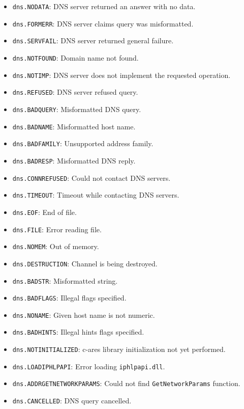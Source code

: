 \begin{itemize}
\tightlist
\item
  \texttt{dns.NODATA}: DNS server returned an answer with no data.
\item
  \texttt{dns.FORMERR}: DNS server claims query was misformatted.
\item
  \texttt{dns.SERVFAIL}: DNS server returned general failure.
\item
  \texttt{dns.NOTFOUND}: Domain name not found.
\item
  \texttt{dns.NOTIMP}: DNS server does not implement the requested
  operation.
\item
  \texttt{dns.REFUSED}: DNS server refused query.
\item
  \texttt{dns.BADQUERY}: Misformatted DNS query.
\item
  \texttt{dns.BADNAME}: Misformatted host name.
\item
  \texttt{dns.BADFAMILY}: Unsupported address family.
\item
  \texttt{dns.BADRESP}: Misformatted DNS reply.
\item
  \texttt{dns.CONNREFUSED}: Could not contact DNS servers.
\item
  \texttt{dns.TIMEOUT}: Timeout while contacting DNS servers.
\item
  \texttt{dns.EOF}: End of file.
\item
  \texttt{dns.FILE}: Error reading file.
\item
  \texttt{dns.NOMEM}: Out of memory.
\item
  \texttt{dns.DESTRUCTION}: Channel is being destroyed.
\item
  \texttt{dns.BADSTR}: Misformatted string.
\item
  \texttt{dns.BADFLAGS}: Illegal flags specified.
\item
  \texttt{dns.NONAME}: Given host name is not numeric.
\item
  \texttt{dns.BADHINTS}: Illegal hints flags specified.
\item
  \texttt{dns.NOTINITIALIZED}: c-ares library initialization not yet
  performed.
\item
  \texttt{dns.LOADIPHLPAPI}: Error loading \texttt{iphlpapi.dll}.
\item
  \texttt{dns.ADDRGETNETWORKPARAMS}: Could not find
  \texttt{GetNetworkParams} function.
\item
  \texttt{dns.CANCELLED}: DNS query cancelled.
\end{itemize}

